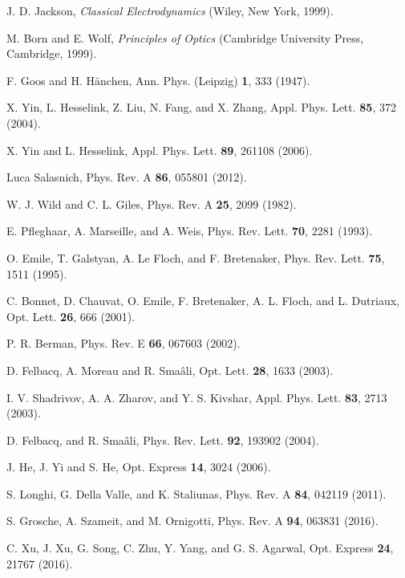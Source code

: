 \documentclass[twocolumn,showpacs,preprintnumbers,amsmath,amssymb]{revtex4}
\begin{document}
\begin{references}

 J. D. Jackson, \emph{Classical Electrodynamics} (Wiley, New York, 1999).

 M. Born and E. Wolf, \emph{Principles of Optics} (Cambridge University Press, Cambridge, 1999).

 F. Goos and H. H\"{a}nchen, Ann. Phys. (Leipzig) \textbf{1}, 333 (1947).

 X. Yin, L. Hesselink, Z. Liu, N. Fang, and X. Zhang, Appl. Phys. Lett. \textbf{85}, 372 (2004).

 X. Yin and L. Hesselink, Appl. Phys. Lett. \textbf{89}, 261108 (2006).

 Luca Salasnich, Phys. Rev. A \textbf{86}, 055801 (2012).

 W. J. Wild and C. L. Giles, Phys. Rev. A \textbf{25}, 2099 (1982).

 E. Pfleghaar, A. Marseille, and A. Weis, Phys. Rev. Lett. \textbf{70}, 2281 (1993).

 O. Emile, T. Galstyan, A. Le Floch, and F. Bretenaker, Phys. Rev. Lett. \textbf{75}, 1511 (1995).

 C. Bonnet, D. Chauvat, O. Emile, F. Bretenaker, A. L. Floch, and L. Dutriaux, Opt. Lett. \textbf{26}, 666 (2001).

 P. R. Berman, Phys. Rev. E \textbf{66}, 067603 (2002).

 D. Felbacq, A. Moreau and R. Sma\^{a}li, Opt. Lett. \textbf{28}, 1633 (2003).

 I. V. Shadrivov, A. A. Zharov, and Y. S. Kivshar, Appl. Phys. Lett. \textbf{83}, 2713 (2003).

 D. Felbacq, and R. Sma\^{a}li, Phys. Rev. Lett. \textbf{92}, 193902 (2004).

 J. He, J. Yi and S. He, Opt. Express \textbf{14}, 3024 (2006).

 S. Longhi, G. Della Valle, and K. Staliunas, Phys. Rev. A \textbf{84}, 042119 (2011).

 S. Grosche, A. Szameit, and M. Ornigotti, Phys. Rev. A \textbf{94}, 063831 (2016).

 C. Xu, J. Xu, G. Song, C. Zhu, Y. Yang, and G. S. Agarwal, Opt. Express \textbf{24}, 21767 (2016).


\end{references}
\end{document}
